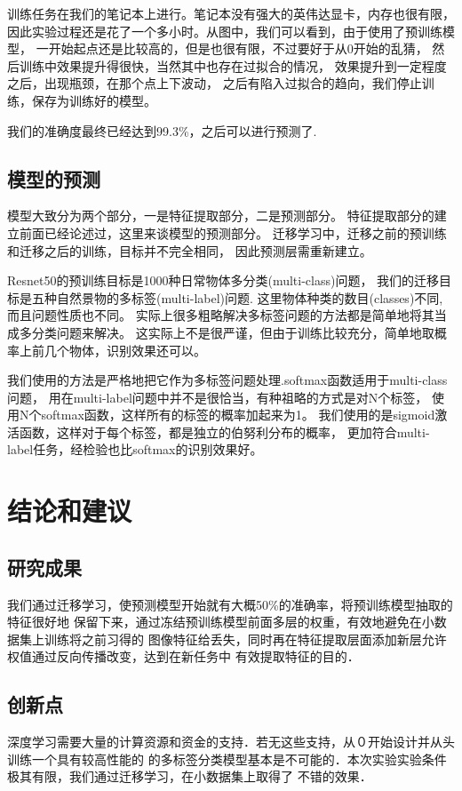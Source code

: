 训练任务在我们的笔记本上进行。笔记本没有强大的英伟达显卡，内存也很有限，
因此实验过程还是花了一个多小时。从图中，我们可以看到，由于使用了预训练模型，
一开始起点还是比较高的，但是也很有限，不过要好于从0开始的乱猜，
然后训练中效果提升得很快，当然其中也存在过拟合的情况，
效果提升到一定程度之后，出现瓶颈，在那个点上下波动，
之后有陷入过拟合的趋向，我们停止训练，保存为训练好的模型。

我们的准确度最终已经达到99.3\%，之后可以进行预测了.

\subsection{模型的预测}

模型大致分为两个部分，一是特征提取部分，二是预测部分。
特征提取部分的建立前面已经论述过，这里来谈模型的预测部分。
迁移学习中，迁移之前的预训练和迁移之后的训练，目标并不完全相同，
因此预测层需重新建立。

Resnet50的预训练目标是1000种日常物体多分类(multi-class)问题，
我们的迁移目标是五种自然景物的多标签(multi-label)问题.
这里物体种类的数目(classes)不同,而且问题性质也不同。
实际上很多粗略解决多标签问题的方法都是简单地将其当成多分类问题来解决。
这实际上不是很严谨，但由于训练比较充分，简单地取概率上前几个物体，识别效果还可以。

我们使用的方法是严格地把它作为多标签问题处理.softmax函数适用于multi-class问题，
用在multi-label问题中并不是很恰当，有种祖略的方式是对N个标签，
使用N个softmax函数，这样所有的标签的概率加起来为1。
我们使用的是sigmoid激活函数，这样对于每个标签，都是独立的伯努利分布的概率，
更加符合multi-label任务，经检验也比softmax的识别效果好。

\section{结论和建议}

\subsection{研究成果}
我们通过迁移学习，使预测模型开始就有大概50\%的准确率，将预训练模型抽取的特征很好地
保留下来，通过冻结预训练模型前面多层的权重，有效地避免在小数据集上训练将之前习得的
图像特征给丢失，同时再在特征提取层面添加新层允许权值通过反向传播改变，达到在新任务中
有效提取特征的目的．


\subsection{创新点}

深度学习需要大量的计算资源和资金的支持．若无这些支持，从０开始设计并从头训练一个具有较高性能的
的多标签分类模型基本是不可能的．本次实验实验条件极其有限，我们通过迁移学习，在小数据集上取得了
不错的效果．















